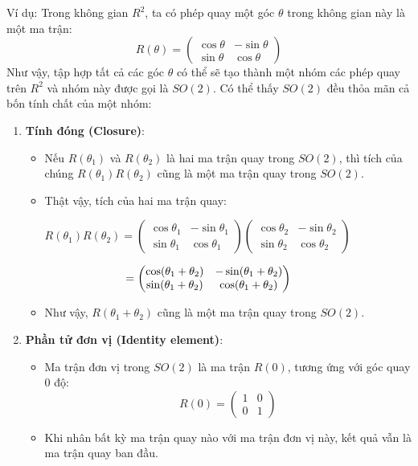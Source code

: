 Ví dụ: Trong không gian $R^2$, ta có phép quay một góc $\theta$ trong không gian này là một ma trận:
$$
R(\theta) = \begin{pmatrix}
\cos{\theta} & -\sin{\theta} \\
\sin{\theta} & \cos{\theta}
\end{pmatrix}
$$
Như vậy, tập hợp tất cả các góc $\theta$ có thể sẽ tạo thành một nhóm các phép quay trên $R^2$ và nhóm này được gọi là $SO(2)$. Có thể thấy $SO(2)$ đều thỏa mãn cả bốn tính chất của một nhóm:
\begin{enumerate}
    \item \textbf{Tính đóng (Closure)}:
    \begin{itemize}
        \item Nếu \(R(\theta_1)\) và \(R(\theta_2)\) là hai ma trận quay trong \(SO(2)\), thì tích của chúng \(R(\theta_1)R(\theta_2)\) cũng là một ma trận quay trong \(SO(2)\).
        \item Thật vậy, tích của hai ma trận quay:
        
        $
        R(\theta_1)R(\theta_2) = \begin{pmatrix}
        \cos{\theta_1} & -\sin{\theta_1} \\
        \sin{\theta_1} & \cos{\theta_1}
        \end{pmatrix}
        \begin{pmatrix}
        \cos{\theta_2} & -\sin{\theta_2} \\
        \sin{\theta_2} & \cos{\theta_2}
        \end{pmatrix}
        $
        
        $
        \hspace{2.5cm}= \begin{pmatrix}
        \cos(\theta_1 + \theta_2) & -\sin(\theta_1 + \theta_2) \\
        \sin(\theta_1 + \theta_2) & \cos(\theta_1 + \theta_2)
        \end{pmatrix}
        $

        \item Như vậy, \(R(\theta_1 + \theta_2)\) cũng là một ma trận quay trong \(SO(2)\).
    \end{itemize}
    
    \item \textbf{Phần tử đơn vị (Identity element)}:
    \begin{itemize}
        \item Ma trận đơn vị trong \(SO(2)\) là ma trận \(R(0)\), tương ứng với góc quay 0 độ:
        \[
        R(0) = \begin{pmatrix}
        1 & 0 \\
        0 & 1
        \end{pmatrix}
        \]
        \item Khi nhân bất kỳ ma trận quay nào với ma trận đơn vị này, kết quả vẫn là ma trận quay ban đầu.
    \end{itemize}


\end{enumerate}
